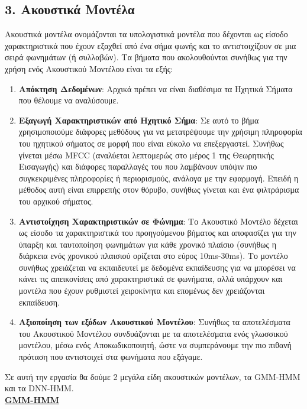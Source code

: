 \documentclass{article}
\begin{document}
\subsection*{3. Ακουστικά Μοντέλα}
Ακουστικά μοντέλα ονομάζονται τα υπολογιστικά μοντέλα που δέχονται ως είσοδο χαρακτηριστικά που έχουν εξαχθεί από ένα σήμα φωνής και το αντιστοιχίζουν σε μια σειρά φωνημάτων (ή συλλαβών). Τα βήματα που ακολουθούνται συνήθως για την χρήση ενός Ακουστικού Μοντέλου είναι τα εξής:
\begin{enumerate}
%
%
\item \textbf{Απόκτηση Δεδομένων}: Αρχικά πρέπει να είναι διαθέσιμα τα Ηχητικά Σήματα που θέλουμε να αναλύσουμε.
%
%
\item \textbf{Εξαγωγή Χαρακτηριστικών από Ηχητικό Σήμα}: Σε αυτό το βήμα χρησιμοποιούμε διάφορες μεθόδους για να μετατρέψουμε την χρήσιμη πληροφορία του ηχητικού σήματος σε μορφή που είναι εύκολο να επεξεργαστεί. Συνήθως γίνεται μέσω MFCC (αναλύεται λεπτομερώς στο μέρος 1 της Θεωρητικής Εισαγωγής) και διάφορες παραλλαγές του που λαμβάνουν υπόψιν πιο συγκεκριμένες πληροφορίες ή περιορισμούς, ανάλογα με την εφαρμογή. Επειδή η μέθοδος αυτή είναι επιρρεπής στον θόρυβο, συνήθως γίνεται και ένα φιλτράρισμα του αρχικού σήματος.
%
%
\item \textbf{Αντιστοίχηση Χαρακτηριστικών σε Φώνημα}: Το Ακουστικό Μοντέλο δέχεται ως είσοδο τα χαρακτηριστικά του προηγούμενου βήματος και αποφασίζει για την ύπαρξη και ταυτοποίηση φωνημάτων για κάθε χρονικό πλαίσιο (συνήθως η διάρκεια ενός χρονικού πλαισιού ορίζεται στο εύρος 10ms-30ms). Το μοντέλο συνήθως χρειάζεται να εκπαιδευτεί με δεδομένα εκπαίδευσης για να μπορέσει να κάνει τις απεικονίσεις από χαρακτηριστικά σε φωνήματα, αλλά υπάρχουν και μοντέλα που έχουν ρυθμιστεί χειροκίνητα και επομένως δεν χρειάζονται εκπαίδευση.
%
%
\item \textbf{Αξιοποίηση των εξόδων Ακουστικού Μοντέλου}: Συνήθως τα αποτελέσματα του Ακουστικού Μοντέλου συνδυάζονται με τα αποτελέσματα ενός γλωσσικού μοντέλου, μέσω ενός Αποκωδικοποιητή, ώστε να συμπεράνουμε την πιο πιθανή πρόταση που αντιστοιχεί στα φωνήματα που εξάγαμε.
\end{enumerate}
%
Σε αυτή την εργασία θα δούμε 2 μεγάλα είδη ακουστικών μοντέλων, τα GMM-HMM και τα DNN-HMM.  
\\[5mm]
\textbf{\underline{GMM-HMM}}
\label{gmm-hmm}
\\[1mm]
\end{document}
